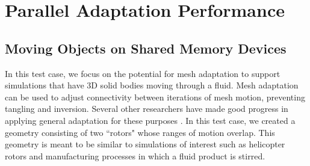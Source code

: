 \section{Parallel Adaptation Performance}

\subsection{Moving Objects on Shared Memory Devices}

In this test case, we focus on the potential for mesh adaptation to support simulations
that have 3D solid bodies moving through a fluid.
Mesh adaptation can be used to adjust connectivity between iterations of
mesh motion, preventing tangling and inversion.
Several other researchers have made good progress in applying general adaptation
for these purposes
\cite{compere2010mesh,wicke2010dynamic,clausen2013simulating,chen2015parallel}.
In this test case, we created a geometry consisting of two ``rotors" whose ranges of
motion overlap.
This geometry is meant to be similar to simulations of interest such as
helicopter rotors and manufacturing processes in which a fluid product is
stirred.

